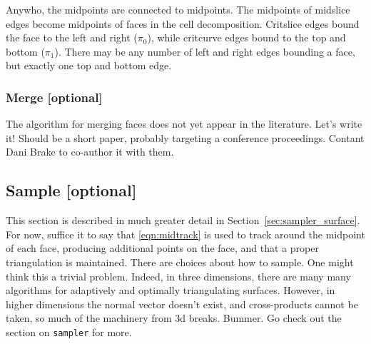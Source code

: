 Anywho, the midpoints are connected to midpoints.  The midpoints of midslice edges become midpoints of faces in the cell decomposition.  Critslice edges bound the face to the left and right ($\pi_0$), while critcurve edges bound to the top and bottom ($\pi_1$).  There may be any number of left and right edges bounding a face, but exactly one top and bottom edge.    


\subsubsection{Merge [optional]}

The algorithm for merging faces does not yet appear in the literature.  Let's write it!  Should be a short paper, probably targeting a conference proceedings.  Contant Dani Brake to co-author it with them.


\subsection{Sample [optional]}
This section is described in much greater detail in Section~\ref{sec:sampler_surface}.  For now, suffice it to say that \eqref{eqn:midtrack} is used to track around the midpoint of each face, producing additional points on the face, and that a proper triangulation is maintained.  There are choices about how to sample.  One might think this a trivial problem.  Indeed, in three dimensions, there are many many algorithms for adaptively and optimally triangulating surfaces.  However, in higher dimensions the normal vector doesn't exist, and cross-products cannot be taken, so much of the machinery from 3d breaks.  Bummer.  Go check out the section on {\tt sampler} for more.

